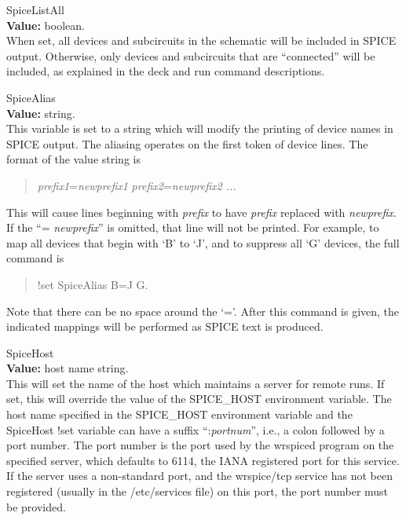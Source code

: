 \begin{description}
\item{\et SpiceListAll}\\
{\bf Value:} boolean.\\
When set, all devices and subcircuits in the schematic will be
included in SPICE output.  Otherwise, only devices and subcircuits
that are ``connected'' will be included, as explained in the {\cb
deck} and {\cb run} command descriptions.

\item{\et SpiceAlias}\\
{\bf Value:} string.\\
This variable is set to a string which will modify the printing of
device names in SPICE output.  The aliasing operates on the first
token of device lines.  The format of the value string is
\begin{quote}
{\it prefix1\/}={\it newprefix1\/} {\it prefix2\/}={\it newprefix2\/ ...}
\end{quote}
This will cause lines beginning with {\it prefix\/} to have {\it
prefix\/} replaced with {\it newprefix\/}.  If the ``={\it
newprefix\/}'' is omitted, that line will not be printed.  For
example, to map all devices that begin with `B' to `J', and to suppress
all `G' devices, the full command is
\begin{quote}
{\vt !set SpiceAlias B=J G}.
\end{quote}
Note that there can be no space around the `='.  After this command is
given, the indicated mappings will be performed as SPICE text is
produced.

\item{\et SpiceHost}\\
{\bf Value:} host name string.\\
This will set the name of the host which maintains a server for remote
{\WRspice} runs.  If set, this will override the value of the {\et
SPICE\_HOST} environment variable.  The host name specified in the
{\et SPICE\_HOST} environment variable and the {\et SpiceHost} {\cb
!set} variable can have a suffix ``{\vt :}{\it portnum}'', i.e., a
colon followed by a port number.  The port number is the port used by
the {\vt wrspiced} program on the specified server, which defaults to
6114, the IANA registered port for this service.  If the server uses a
non-standard port, and the {\vt wrspice/tcp} service has not been
registered (usually in the {\vt /etc/services} file) on this port, the
port number must be provided.


\end{description}

